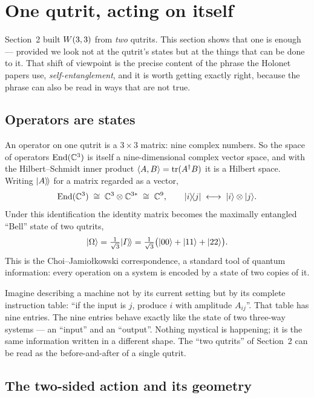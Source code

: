 \section{One qutrit, acting on itself}
\label{sec:self}

Section~2 built $W(3,3)$ from \emph{two} qutrits. This section shows that one is enough ---
provided we look not at the qutrit's states but at the things that can be done to it.
That shift of viewpoint is the precise content of the phrase the Holonet papers use,
\emph{self-entanglement}, and it is worth getting exactly right, because the phrase can
also be read in ways that are not true.

\subsection{Operators are states}

An operator on one qutrit is a $3\times3$ matrix: nine complex numbers. So the space of
operators $\mathrm{End}(\mathbb{C}^3)$ is itself a nine-dimensional complex vector space, and with the
Hilbert--Schmidt inner product $\langle A,B\rangle=\operatorname{tr}(A^\dagger B)$ it is a Hilbert
space. Writing $\lvert A\rangle\!\rangle$ for a matrix regarded as a vector,
\[
\mathrm{End}(\mathbb{C}^3)\;\cong\;\mathbb{C}^3\otimes\mathbb{C}^{3*}\;\cong\;\mathbb{C}^9,
\qquad
\lvert i\rangle\!\langle j\rvert\;\longleftrightarrow\;\lvert i\rangle\otimes\lvert j\rangle.
\]
Under this identification the identity matrix becomes the maximally entangled
``Bell'' state of two qutrits,
\[
\lvert \Omega\rangle=\tfrac{1}{\sqrt3}\lvert I\rangle\!\rangle=\tfrac1{\sqrt3}\bigl(\lvert 00\rangle+\lvert 11\rangle+\lvert 22\rangle\bigr).
\]
This is the Choi--Jamio{\l}kowski correspondence, a standard tool of quantum information:
every operation on a system is encoded by a state of two copies of it.

\begin{plainwords}
Imagine describing a machine not by its current setting but by its complete instruction
table: ``if the input is $j$, produce $i$ with amplitude $A_{ij}$''. That table has nine
entries. The nine entries behave exactly like the state of two three-way systems --- an
``input'' and an ``output''. Nothing mystical is happening; it is the same information
written in a different shape. The ``two qutrits'' of Section~2 can be read as the
before-and-after of a single qutrit.
\end{plainwords}

\subsection{The two-sided action and its geometry}

